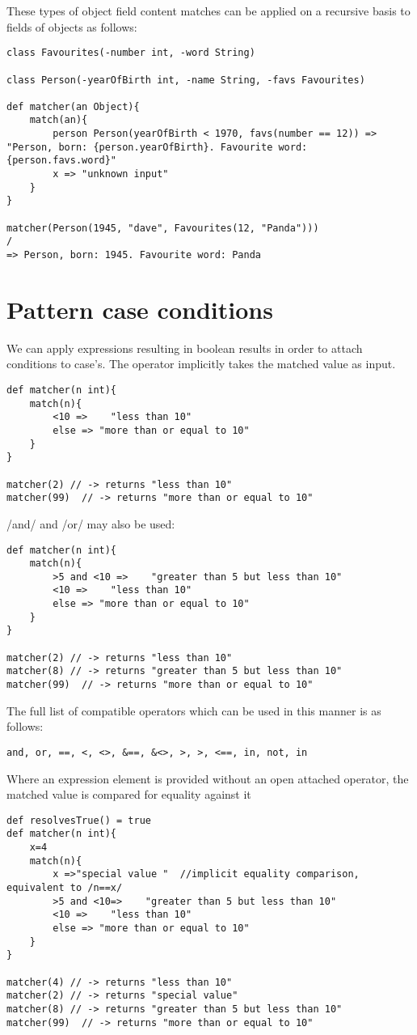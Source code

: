 \documentclass[conc-doc]{subfiles}
\begin{document}
These types of object field content matches can be applied on a recursive basis to fields of objects as follows:
\begin{lstlisting}
class Favourites(-number int, -word String)

class Person(-yearOfBirth int, -name String, -favs Favourites)

def matcher(an Object){
	match(an){
		person Person(yearOfBirth < 1970, favs(number == 12)) => "Person, born: {person.yearOfBirth}. Favourite word: {person.favs.word}"
		x => "unknown input"
	}
}

matcher(Person(1945, "dave", Favourites(12, "Panda")))
/
=> Person, born: 1945. Favourite word: Panda
\end{lstlisting}

\section{Pattern case conditions}
We can apply expressions resulting in boolean results in order to attach conditions to case's. The operator implicitly takes the matched value as input.

\begin{lstlisting}
def matcher(n int){
	match(n){
		<10 =>    "less than 10" 
		else => "more than or equal to 10" 
	}
}

matcher(2) // -> returns "less than 10"
matcher(99)  // -> returns "more than or equal to 10"
\end{lstlisting}

/and/ and /or/ may also be used:

\begin{lstlisting}
def matcher(n int){
	match(n){
		>5 and <10 =>    "greater than 5 but less than 10" 
		<10 =>    "less than 10" 
		else => "more than or equal to 10" 
	}
}

matcher(2) // -> returns "less than 10"
matcher(8) // -> returns "greater than 5 but less than 10"
matcher(99)  // -> returns "more than or equal to 10"
\end{lstlisting}

The full list of compatible operators which can be used in this manner is as follows:

\lstinline{and, or, ==, <, <>, &==, &<>, >, >, <==, in, not, in}

Where an expression element is provided without an open attached operator, the matched value is compared for equality against it

\begin{lstlisting}
def resolvesTrue() = true
def matcher(n int){
	x=4
	match(n){
		x =>"special value "  //implicit equality comparison, equivalent to /n==x/
		>5 and <10=>    "greater than 5 but less than 10" 
		<10 =>    "less than 10" 
		else => "more than or equal to 10" 
	}
}

matcher(4) // -> returns "less than 10"
matcher(2) // -> returns "special value"
matcher(8) // -> returns "greater than 5 but less than 10"
matcher(99)  // -> returns "more than or equal to 10"
\end{lstlisting}
\end{document}
